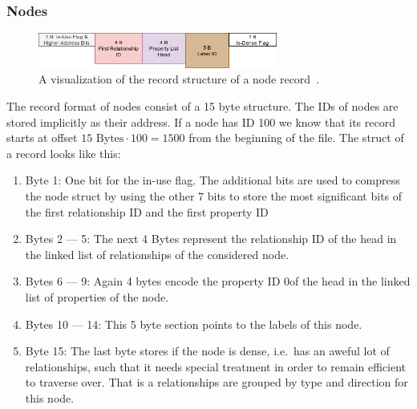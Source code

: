         \subsubsection*{Nodes}
            \begin{figure}[htp]
                \begin{center}
                    \includegraphics[keepaspectratio,height=0.4\textheight,width=0.7\textwidth]{img/04-databases/node_record.png}
                \end{center}
                \caption{A visualization of the record structure of a node record~\autocite{neo4jNodeRecordFormat}.}
                \label{node-record-format}
            \end{figure}
            The record format of nodes consist of a 15 byte structure.
            The IDs of nodes are stored implicitly as their address.
            If a node has ID 100 we know that its record starts at offset $15 \text{ Bytes} \cdot 100 = 1500$ from the beginning of the file.
            The struct of a record looks like this:
            \begin{enumerate}
                \item Byte 1: One bit for the in-use flag. 
                The additional bits are used to compress the node struct by using the other 7 bits to store the most significant bits of the first relationship ID and the first property ID 
                \item Bytes 2 --- 5: The next 4 Bytes represent the relationship ID of the head in the linked list of relationships of the considered node.
                \item Bytes 6 --- 9: Again 4 bytes encode the property ID 0of the head in the linked list of properties of the node.
                \item Bytes 10 --- 14: This 5 byte section points to the labels of this node.
                \item Byte 15: The last byte stores if the node is dense, i.e.\ has an aweful lot of relationships, such that it needs special treatment in order to remain efficient to traverse over.
                That is a relationships are grouped by type and direction for this node.
            \end{enumerate}
            
